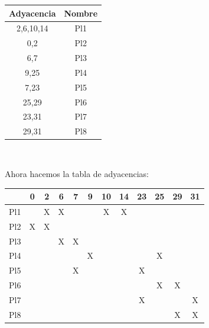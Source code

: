 \documentclass[a4paper,12pt]{article}
\begin{document}
\begin{enumerate}[label=\textcolor{teal}{\textbf{\arabic*.}}]
        \begin{table} [H]
            \centering
            \begin{tabular}{|c|c|}
                \hline
                Adyacencia & Nombre\\ 
                \hline
                2,6,10,14 & Pl1\\ 
                \hline 
                0,2 & Pl2 \\ 
                \hline 
                6,7 & Pl3 \\
                \hline 
                9,25 & Pl4 \\ 
                \hline 
                7,23 & Pl5 \\ 
                \hline 
                25,29 & Pl6 \\ 
                \hline 
                23,31 & Pl7 \\ 
                \hline
                29,31 & Pl8 \\ 
                \hline 
            \end{tabular}\\
        \end{table}
    
        Ahora hacemos la tabla de adyacencias:
        \begin{table} [H]
            \centering
            \begin{tabular}{|c|c|c|c|c|c|c|c|c|c|c|c|}
                \hline
                    & 0 & 2 & 6 & 7 & 9 & 10 & 14 & 23 & 25 & 29 & 31\\ \hline
                Pl1 &   & X & X &   &   &  X &  X &    &    &    &   \\ \hline 
                Pl2 & X & X &   &   &   &    &    &    &    &    &   \\ \hline 
                Pl3 &   &   & X & X &   &    &    &    &    &    &   \\ \hline 
                Pl4 &   &   &   &   & X &    &    &    & X  &    &   \\ \hline 
                Pl5 &   &   &   & X &   &    &    &  X &    &    &   \\ \hline 
                Pl6 &   &   &   &   &   &    &    &    & X  & X  &   \\ \hline 
                Pl7 &   &   &   &   &   &    &    & X  &    &    & X \\ \hline 
                Pl8 &   &   &   &   &   &    &    &    &    & X  & X \\ \hline 
            \end{tabular}
        \end{table}
        \hfill


\end{enumerate}
\end{document}
